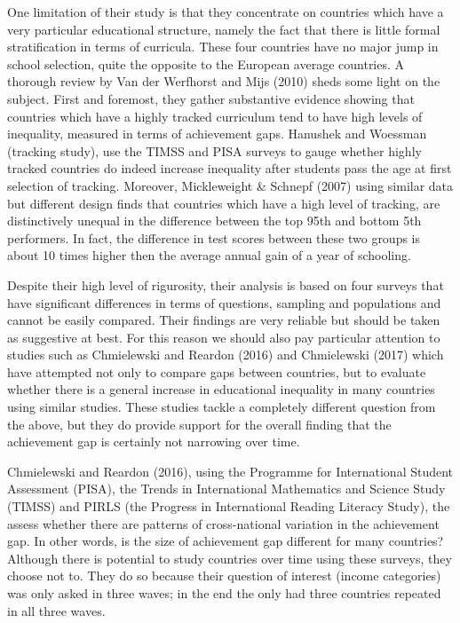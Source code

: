\documentclass[11pt, a4paper]{article}\usepackage[]{graphicx}\usepackage[]{color}
\begin{document}
One limitation of their study is that they concentrate on countries which have a very particular educational structure, namely the fact that there is little formal stratification in terms of curricula. These four countries have no major jump in school selection, quite the opposite to the European average countries. A thorough review by Van der Werfhorst and Mijs (2010) sheds some light on the subject. First and foremost, they gather substantive evidence showing that countries which have a highly tracked curriculum tend to have high levels of inequality, measured in terms of achievement gaps. Hanushek and Woessman (tracking study), use the TIMSS and PISA surveys to gauge whether highly tracked countries do indeed increase inequality after students pass the age at first selection of tracking. Moreover, Mickleweight \& Schnepf (2007) using similar data but different design finds that countries which have a high level of tracking, are distinctively unequal in the difference between the top 95th and bottom 5th performers. In fact, the difference in test scores between these two groups is about 10 times higher then the average annual gain of a year of schooling.

Despite their high level of rigurosity, their analysis is based on four surveys that have significant differences in terms of questions, sampling and populations and cannot be easily compared. Their findings are very reliable but should be taken as suggestive at best.  For this reason we should also pay particular attention to studies such as Chmielewski and Reardon (2016) and Chmielewski (2017) which have attempted not only to compare gaps between countries, but to evaluate whether there is a general increase in educational inequality in many countries using similar studies. These studies tackle a completely different question from the above, but they do provide support for the overall finding that the achievement gap is certainly not narrowing over time.

Chmielewski and Reardon (2016), using the Programme for International Student Assessment (PISA), the Trends in International Mathematics and Science Study (TIMSS) and PIRLS (the Progress in International Reading Literacy Study), the assess whether there are patterns of cross-national variation in the achievement gap. In other words, is the size of achievement gap different for many countries? Although there is potential to study countries over time using these surveys, they choose not to. They do so because their question of interest (income categories) was only asked in three waves; in the end the only had three countries repeated in all three waves. 
\end{document}
